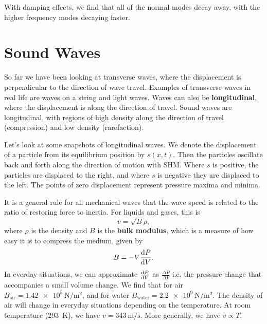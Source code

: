 \documentclass[../classical_mechanics.tex]{subfiles}
\begin{document}
        With damping effects, we find that all of the normal modes decay away, with the higher frequency modes decaying faster.

    \section{Sound Waves}\label{sec:sound-waves}
        So far we have been looking at transverse waves, where the displacement is perpendicular to the direction of wave travel.
        Examples of transverse waves in real life are waves on a string and light waves.
        Waves can also be \textbf{longitudinal}, where the displacement is along the direction of travel.
        Sound waves are longitudinal, with regions of high density along the direction of travel (compression) and low density (rarefaction).
        
        Let's look at some snapshots of longitudinal waves.
        We denote the displacement of a particle from its equilibrium position by $s(x,t)$.
        Then the particles oscillate back and forth along the direction of motion with SHM.
        Where $s$ is positive, the particles are displaced to the right, and where $s$ is negative they are displaced to the left.
        The points of zero displacement represent pressure maxima and minima.

        It is a general rule for all mechanical waves that the wave speed is related to the ratio of restoring force to inertia.
        For liquids and gases, this is
        \begin{equation}
            v=\sqrt{B}{\rho},
        \end{equation}
        where $\rho$ is the density and $B$ is the \textbf{bulk modulus}, which is a measure of how easy it is to compress the medium, given by
        \begin{equation}
            B=-V\dv{P}{V}.
        \end{equation}
        In everday situations, we can approximate $\dv{P}{V}$ as $\frac{\Delta P}{\Delta V}$ i.e. the pressure change that accompanies a small volume change.
        We find that for air $B_\text{air}=\qty{1.42e5}{\newton\per\meter\squared}$, and for water $B_\text{water}=\qty{2.2e9}{\newton\per\meter\squared}$.
        The density of air will change in everyday situations depending on the temperature.
        At room temperature (\qty{293}{\kelvin}), we have $v=\qty{343}{\meter\per\second}$.
        More generally, we have $v\propto T$.
\end{document}
